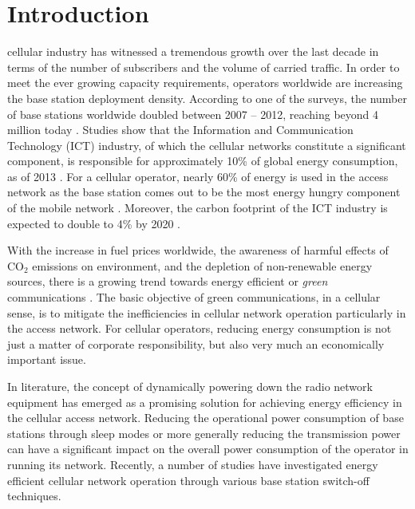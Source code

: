 \documentclass[journal]{IEEEtran}
\begin{document}
\IEEEpeerreviewmaketitle



\section{Introduction}
 cellular industry has witnessed a tremendous growth over the last decade in terms of the number of subscribers and the volume of carried traffic. In order to meet the ever growing capacity requirements, operators worldwide are increasing the base station deployment density. According to one of the surveys, the number of base stations worldwide doubled between 2007 -- 2012, reaching beyond 4 million today \cite{ee_bs_sleep}.  Studies show that the Information and Communication Technology (ICT) industry, of which the cellular networks constitute a significant component, is responsible for approximately 10\% of global energy consumption, as of 2013 \cite{EC_energy}. For a cellular operator, nearly 60\% of energy is used in the access network as the base station comes out to be the most energy hungry component of the mobile network \cite{gr_commag}. Moreover, the carbon footprint of the ICT industry is expected to double to 4\% by 2020 \cite{carbon_ICT,ee_bs_sleep}.




With the increase in fuel prices worldwide, the awareness of harmful effects of $\text{CO}_2$ emissions on environment, and the depletion of non-renewable energy sources, there is a growing trend towards energy efficient or \emph{green} communications \cite{GC_CRC}. The basic objective of green communications, in a cellular sense, is to mitigate the inefficiencies in cellular network operation particularly in the access network. For cellular operators, reducing energy consumption is not just a matter of corporate responsibility, but also very much an economically important issue. 




In literature, the concept of dynamically powering down the radio network equipment has emerged as a promising solution for achieving energy efficiency in the cellular access network. Reducing the operational power consumption of base stations through sleep modes or more generally reducing the transmission power can have a significant impact on the overall power consumption of the operator in running its network. Recently, a number of studies have investigated energy efficient cellular network operation through various base station switch-off techniques. 
\end{document}
